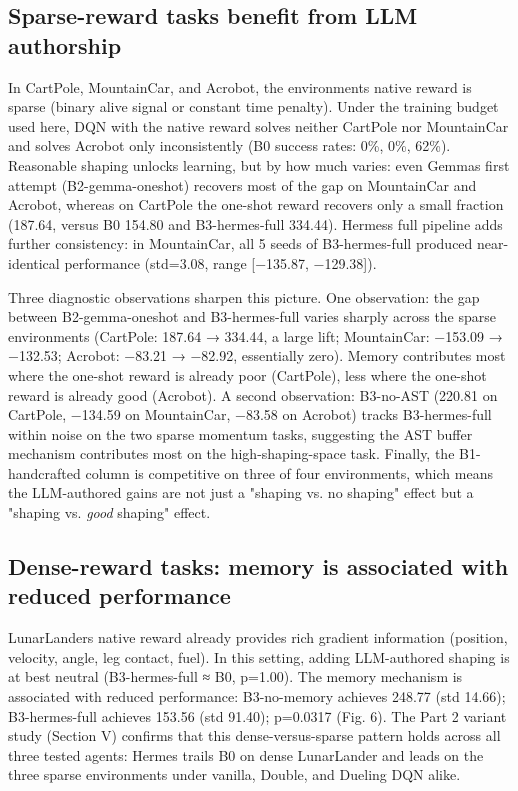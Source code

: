 \documentclass[conference,letterpaper,10pt]{IEEEtran}
\begin{document}
\subsection{Sparse-reward tasks benefit from LLM authorship}

In CartPole, MountainCar, and Acrobot, the environment\textquotesingle s native reward is sparse (binary alive signal or constant time penalty). Under the training budget used here, DQN with the native reward solves neither CartPole nor MountainCar and solves Acrobot only inconsistently (B0 success rates: 0\%, 0\%, 62\%). Reasonable shaping unlocks learning, but by how much varies: even Gemma\textquotesingle s first attempt (B2-gemma-oneshot) recovers most of the gap on MountainCar and Acrobot, whereas on CartPole the one-shot reward recovers only a small fraction (187.64, versus B0 154.80 and B3-hermes-full 334.44). Hermes\textquotesingle s full pipeline adds further consistency: in MountainCar, all 5 seeds of B3-hermes-full produced near-identical performance (std=3.08, range {[}−135.87, −129.38{]}).

Three diagnostic observations sharpen this picture. One observation: the gap between B2-gemma-oneshot and B3-hermes-full varies sharply across the sparse environments (CartPole: 187.64 → 334.44, a large lift; MountainCar: −153.09 → −132.53; Acrobot: −83.21 → −82.92, essentially zero). Memory contributes most where the one-shot reward is already poor (CartPole), less where the one-shot reward is already good (Acrobot). A second observation: B3-no-AST (220.81 on CartPole, −134.59 on MountainCar, −83.58 on Acrobot) tracks B3-hermes-full within noise on the two sparse momentum tasks, suggesting the AST buffer mechanism contributes most on the high-shaping-space task. Finally, the B1-handcrafted column is competitive on three of four environments, which means the LLM-authored gains are not just a "shaping vs. no shaping" effect but a "shaping vs. \emph{good} shaping" effect.

\subsection{Dense-reward tasks: memory is associated with reduced performance}

LunarLander\textquotesingle s native reward already provides rich gradient information (position, velocity, angle, leg contact, fuel). In this setting, adding LLM-authored shaping is at best neutral (B3-hermes-full ≈ B0, p=1.00). The memory mechanism is associated with reduced performance: B3-no-memory achieves 248.77 (std 14.66); B3-hermes-full achieves 153.56 (std 91.40); p=0.0317 (Fig. 6). The Part 2 variant study (Section V) confirms that this dense-versus-sparse pattern holds across all three tested agents: Hermes trails B0 on dense LunarLander and leads on the three sparse environments under vanilla, Double, and Dueling DQN alike.
\end{document}
